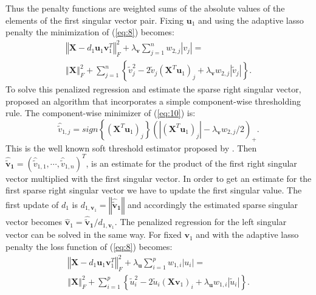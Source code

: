 Thus the penalty functions are weighted sums of the absolute values of the elements of the first singular vector pair. 
\nocite{Tib1996}
Fixing $\mathbf{u}_{1}$ and using the adaptive lasso penalty the minimization of (\ref{eq:8}) becomes:
\begin{equation}
\begin{split}
\left\Vert \mathbf{X} - d_{1}\mathbf{u}_{1}\mathbf{v}_{1}^{T}\right\Vert_{F}^{2} + \lambda_{\mathbf{v}}\sum_{j=1}^{n}w_{2,j}|v_{j}|= \\
\left\Vert \mathbf{X} \right\Vert_{F}^{2} + \sum_{j=1}^{n} \left\{ \tilde{v}_{j}^2 - 2\tilde{v}_{j}(\mathbf{X}^{T}\mathbf{u}_{1})_{j} + \lambda_{\mathbf{v}} w_{2,j}|\tilde{v}_{j}|\right\}.
\end{split}   
\label{eq:10}      
\end{equation} 
To solve this penalized regression and estimate the sparse right singular vector, \citet{Lee2010} proposed an algorithm that incorporates a simple component-wise thresholding rule. The component-wise minimizer of (\ref{eq:10}) is:
\begin{equation}
\hat{\tilde{v}}_{1,j}=\textit{sign}\left\{(\mathbf{X}^{T}\mathbf{u}_{1})_{j}\right\}(|(\mathbf{X}^{T}\mathbf{u}_{1})_{j}|-\lambda_{\mathbf{v}}w_{2,j}/2)_{+}.
\end{equation}
This is the well known soft threshold estimator proposed by \citet{Tibshirani1996}. Then $\mathbf{\hat{\tilde{v}}_{1}}=(\hat{\tilde{v}}_{1,1},\cdots,\hat{\tilde{v}}_{1,n})^{T}$, is an estimate for the product of the first right singular vector multiplied with the first singular vector. In order to get an estimate for the first sparse right singular vector we have to update the first singular value. The first update of $d_{1}$ is $d_{1,\mathbf{v}_{1}}=\left\Vert\mathbf{\hat{\tilde{v}}_{1}}\right\Vert$ and accordingly the estimated sparse singular vector becomes $\mathbf{\hat{v}}_{1}=\mathbf{\hat{\tilde{v}}_{1}}/d_{1,\mathbf{v}_{1}}$.
The penalized regression for the left singular vector can be solved in the same way. For fixed $\mathbf{v}_{1}$ and with the adaptive lasso penalty the loss function of (\ref{eq:8}) becomes:
\begin{equation}
\begin{split}
\left\Vert \mathbf{X} - d_{1}\mathbf{u}_{1}\mathbf{v}_{1}^{T}\right\Vert_{F}^{2} + \lambda_{\mathbf{u}}\sum_{i=1}^{p}w_{1,i}|u_{i}|= \\
\left\Vert \mathbf{X} \right\Vert_{F}^{2} + \sum_{i=1}^{p} \left\{ \tilde{u}_{i}^2 - 2\tilde{u}_{i}(\mathbf{X}\mathbf{v}_{1})_{i} + \lambda_{\mathbf{u}} w_{1,i}|\tilde{u}_{i}|\right\}.
\end{split}  
\label{eq:12}    
\end{equation} 
